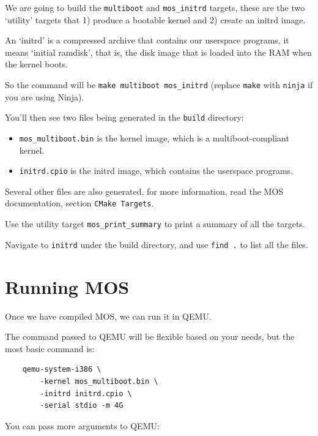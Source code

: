 We are going to build the \texttt{multiboot} and \texttt{mos\_initrd} targets, these are the two
`utility' targets that 1) produce a bootable kernel and 2) create an initrd image.

An `initrd' is a compressed archive that contains our userspace programs, it means `initial ramdisk',
that is, the disk image that is loaded into the RAM when the kernel boots.

So the command will be \texttt{make multiboot mos\_initrd} (replace \texttt{make} with \texttt{ninja} if you are using Ninja).

You'll then see two files being generated in the \texttt{build} directory:

\begin{itemize}
    \item \texttt{mos\_multiboot.bin} is the kernel image, which is a multiboot-compliant kernel.
    \item \texttt{initrd.cpio} is the initrd image, which contains the userspace programs.
\end{itemize}

Several other files are also generated, for more information, read the MOS documentation, section \texttt{CMake Targets}.

\begin{exercise}
    \item Use the utility target \texttt{mos\_print\_summary} to print a summary of all the targets.
    \item Navigate to \texttt{initrd} under the build directory, and use \texttt{find .} to list all the files.
\end{exercise}

\section{Running MOS}

Once we have compiled MOS, we can run it in QEMU.

The command passed to QEMU will be flexible based on your needs, but the most basic command is:

\begin{verbatim}
    qemu-system-i386 \
        -kernel mos_multiboot.bin \
        -initrd initrd.cpio \
        -serial stdio -m 4G
\end{verbatim}

You can pass more arguments to QEMU:

